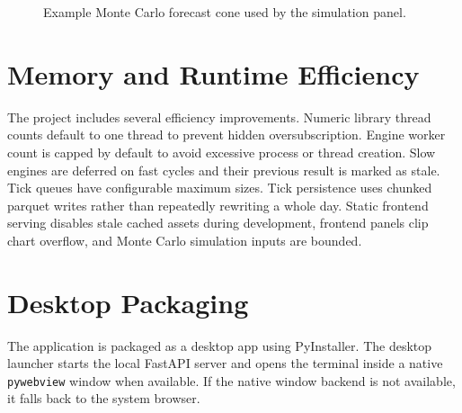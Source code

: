 \documentclass[conference]{IEEEtran}
\begin{document}
\begin{figure}[!t]
\centering
{}
\caption{Example Monte Carlo forecast cone used by the simulation panel.}
\label{fig:monte-carlo-cone}
\end{figure}

\section{Memory and Runtime Efficiency}

The project includes several efficiency improvements. Numeric library thread
counts default to one thread to prevent hidden oversubscription. Engine
worker count is capped by default to avoid excessive process or thread
creation. Slow engines are deferred on fast cycles and their previous result
is marked as stale. Tick queues have configurable maximum sizes. Tick
persistence uses chunked parquet writes rather than repeatedly rewriting a
whole day. Static frontend serving disables stale cached assets during
development, frontend panels clip chart overflow, and Monte Carlo simulation
inputs are bounded.

\section{Desktop Packaging}

The application is packaged as a desktop app using PyInstaller. The desktop
launcher starts the local FastAPI server and opens the terminal inside a
native \texttt{pywebview} window when available. If the native window backend
is not available, it falls back to the system browser.
\end{document}
